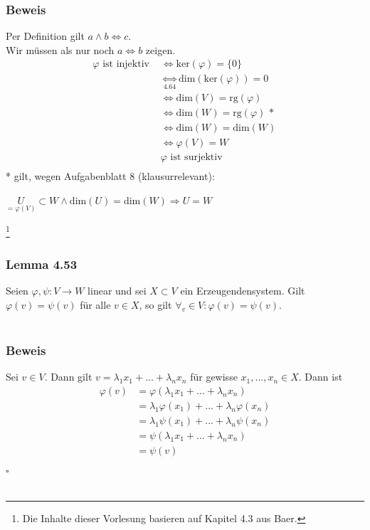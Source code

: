 \documentclass{article}
\begin{document}
\subsubsection*{Beweis}
Per Definition gilt $a \wedge b \Leftrightarrow c$. \\
Wir müssen als nur noch $a \Leftrightarrow b$ zeigen. \\
\begin{align*}
    \varphi \text{ ist injektiv } &\Leftrightarrow \text{ker}(\varphi) = \{0\} \\
    &\underset{4.64}{\Leftrightarrow} \text{dim}(\text{ker}(\varphi)) = 0 \\
    &\Leftrightarrow \text{dim}(V) = \text{rg}(\varphi) \\
    &\Leftrightarrow \text{dim}(W) = \text{rg}(\varphi) \text{ * } \\
    &\Leftrightarrow \text{dim}(W) = \text{dim}(W) \\
    &\Leftrightarrow \varphi(V) = W \\  
    &\varphi \text{ ist surjektiv} \\
\end{align*}
* gilt, wegen Aufgabenblatt 8 (klausurrelevant): \\
\begin{center}
    $\underset{= \varphi(V)}{U} \subset W \wedge \text{dim}(U) = \text{dim}(W) \Rightarrow U = W$ \\
\end{center}

\newpage
\date{Donnerstag, 25.01.18} \footnote[1]{Die Inhalte dieser Vorlesung basieren auf Kapitel 4.3 aus Baer.}
\subsubsection*{Lemma 4.53}
Seien $\varphi, \psi: V \rightarrow W$ linear und sei $X \subset V$ ein Erzeugendensystem.
Gilt $\varphi(v) = \psi(v)$ für alle $v \in X$, so gilt $\forall_v \in V: \varphi(v) = \psi(v)$. \\
\\
\subsubsection*{Beweis}
Sei $v \in V$. Dann gilt $v = \lambda_1 x_1 + ... + \lambda_n x_n$ für gewisse $x_1,...,x_n \in X$. Dann ist \\
\begin{align*}
    \varphi(v) &= \varphi(\lambda_1 x_1 + ... + \lambda_n x_n) \\
    &= \lambda_1 \varphi(x_1) + ... + \lambda_n \varphi(x_n) \\
    &= \lambda_1 \psi(x_1) + ... + \lambda_n \psi(x_n) \\
    &= \psi(\lambda_1 x_1 + ... + \lambda_n x_n) \\
    &= \psi(v) \\
\end{align*}
$\square$ \\
\\
\end{document}
